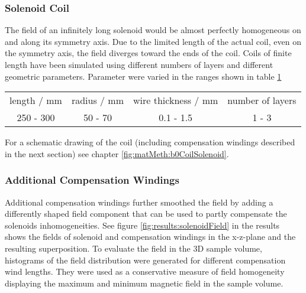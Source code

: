         \subsubsection{Solenoid Coil}
        The field of an infinitely long solenoid would be almost perfectly homogeneous on and along its symmetry axis. Due to the limited length of the actual coil, even on the symmetry axis, the field diverges toward the ends of the coil. Coils of finite length have been simulated using different numbers of layers and different geometric parameters. Parameter were varied in the ranges shown in table \ref{table:simulations:solenoidParameters}
        \begin{table} 
            \label{table:simulations:solenoidParameters}
            \centering
            \begin{tabular}{|c|c|c|c|}
                \hline
                length / mm & radius / mm & wire thickness / mm & number of layers \\
                250 - 300 & 50 - 70 & 0.1 - 1.5 & 1 - 3\\
                \hline
            \end{tabular}
        \end{table}
        For a schematic drawing of the coil (including compensation windings described in the next section) see chapter \ref{fig:matMeth:b0CoilSolenoid}.

        \subsubsection{Additional Compensation Windings}
        Additional compensation windings further smoothed the field by adding a differently shaped field component that can be used to partly compensate the solenoids inhomogeneities. See figure \ref{fig:results:solenoidField} in the results shows the fields of solenoid and compensation windings in the x-z-plane and the resulting superposition.
        To evaluate the field in the 3D sample volume, histograms of the field distribution were generated for different compensation wind lengths. They were used as a conservative measure of field homogeneity displaying the maximum and minimum magnetic field in the sample volume.
